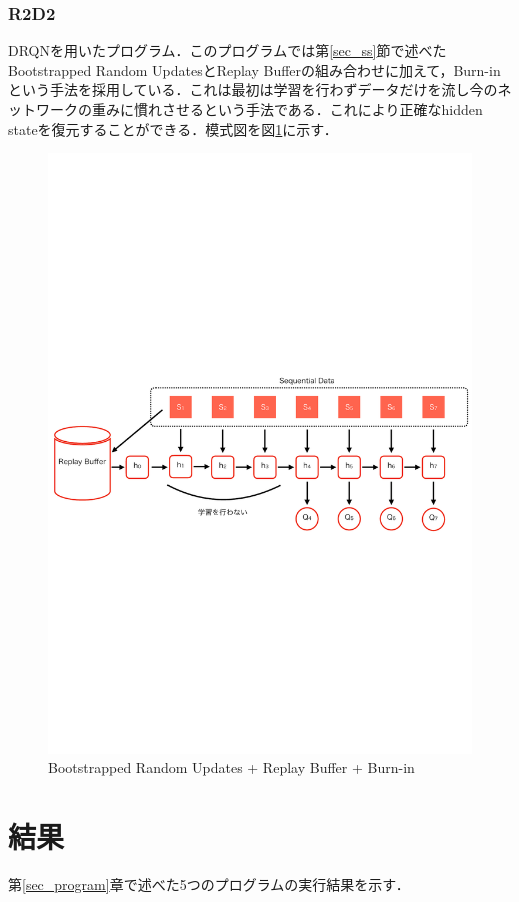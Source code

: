 \documentclass{eithesis}
\begin{document}
    \subsection{R2D2}
      DRQNを用いたプログラム．このプログラムでは第\ref{sec_ss}節で述べたBootstrapped Random UpdatesとReplay Bufferの組み合わせに加えて，Burn-inという手法を採用している．これは最初は学習を行わずデータだけを流し今のネットワークの重みに慣れさせるという手法である．これにより正確なhidden stateを復元することができる．模式図を図\ref{fig_burnIn}に示す．
      \begin{figure}[htbp]
        \centering
        \includegraphics[width=12cm]{./images/burnIn.pdf}
        \caption{Bootstrapped Random Updates + Replay Buffer + Burn-in}
        \label{fig_burnIn}
      \end{figure}

\chapter{結果}
  第\ref{sec_program}章で述べた5つのプログラムの実行結果を示す．
\end{document}
